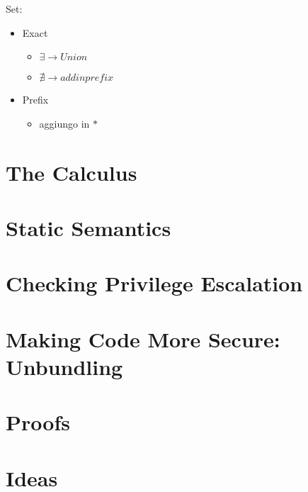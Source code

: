 \documentclass[[12pt,a4paper,twoside,openrigh]{article}
\begin{document}
Set:
\begin{itemize}
\item Exact
	\begin{itemize}
	\item $\exists \rightarrow Union$
	\item $\nexists \rightarrow add in prefix$
	\end{itemize}
\item Prefix
	\begin{itemize}
	\item aggiungo in $*$
	\end{itemize}
\end{itemize}

\section{The Calculus}
\label{sec:calculus}


\section{Static Semantics}
\label{sec:statics}


\section{Checking Privilege Escalation}
\label{sec:privesc}

\newpage

\section{Making Code More Secure: Unbundling}
\label{sec:flow}

\newpage

\section{Proofs}
\label{sec:proofs}

\newpage

\section{Ideas}
\label{sec:ideas}
\end{document}
